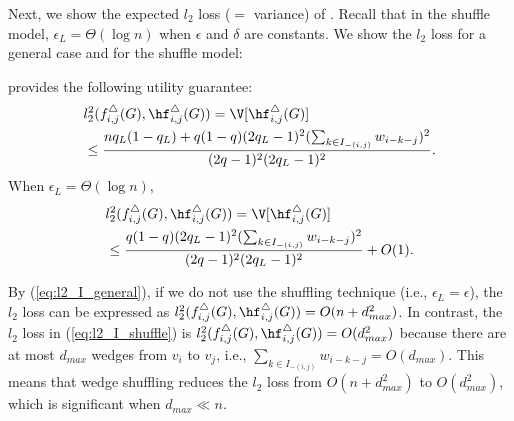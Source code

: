 Next, 
we show the expected $l_2$ loss ($=$ variance) of \AlgWSLE{}. 
Recall that in the shuffle model, $\epsilon_L = \Theta(\log n)$ when $\epsilon$ and $\delta$ are constants. 
We show 
the $l_2$ loss for a general case and for the shuffle model:
\begin{theorem}
\label{thm:l2-loss_I}
\AlgWSLE{} provides the following utility guarantee: 
\begin{align}
& l_2^2(f_{i,j}^\triangle(G), \hf_{i,j}^\triangle(G)) = \V[\hf_{i,j}^\triangle(G)] \nonumber\\ 
& \leq \frac{n q_L(1-q_L) + q(1-q)(2q_L-1)^2 (\sum_{k \in I_{-(i,j)}}w_{i-k-j})^2}{(2q-1)^2(2q_L-1)^2}.
\label{eq:l2_I_general}
\end{align}
When $\epsilon_L = \Theta(\log n)$, 
\begin{align}
& l_2^2(f_{i,j}^\triangle(G), \hf_{i,j}^\triangle(G)) = \V[\hf_{i,j}^\triangle(G)] \nonumber\\ 
& \leq \frac{q(1-q)(2q_L-1)^2 (\sum_{k \in I_{-(i,j)}}w_{i-k-j})^2}{(2q-1)^2(2q_L-1)^2} + O(1).
\label{eq:l2_I_shuffle}
\end{align}
\end{theorem}
By (\ref{eq:l2_I_general}), if we do not use the shuffling technique (i.e., $\epsilon_L = \epsilon$), the $l_2$ loss can be expressed as $l_2^2(f_{i,j}^\triangle(G), \hf_{i,j}^\triangle(G)) = O(n + d_{max}^2)$. 
In contrast, the $l_2$ loss in (\ref{eq:l2_I_shuffle}) is $l_2^2(f_{i,j}^\triangle(G), \hf_{i,j}^\triangle(G)) = O(d_{max}^2)$ because there are at most $d_{max}$ wedges from $v_i$ to $v_j$, i.e., $\sum_{k \in I_{-(i,j)}}w_{i-k-j} = O(d_{max})$. 
This means that wedge shuffling reduces the $l_2$ loss from $O(n + d_{max}^2)$ to $O(d_{max}^2)$, which is significant when $d_{max} \ll n$. 

